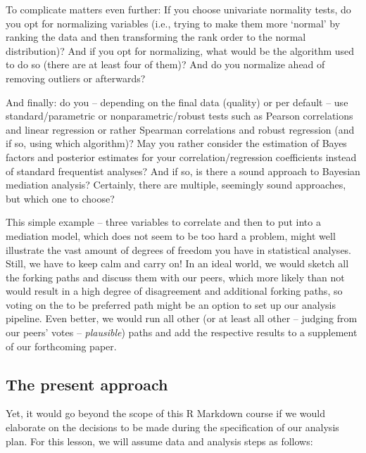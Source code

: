 \documentclass[
]{article}
\begin{document}
To complicate matters even further: If you choose univariate normality
tests, do you opt for normalizing variables (i.e., trying to make them
more `normal' by ranking the data and then transforming the rank order
to the normal distribution)? And if you opt for normalizing, what would
be the algorithm used to do so (there are at least four of them)? And do
you normalize ahead of removing outliers or afterwards?

And finally: do you -- depending on the final data (quality) or per
default -- use standard/parametric or nonparametric/robust tests such as
Pearson correlations and linear regression or rather Spearman
correlations and robust regression (and if so, using which algorithm)?
May you rather consider the estimation of Bayes factors and posterior
estimates for your correlation/regression coefficients instead of
standard frequentist analyses? And if so, is there a sound approach to
Bayesian mediation analysis? Certainly, there are multiple, seemingly
sound approaches, but which one to choose?

This simple example -- three variables to correlate and then to put into
a mediation model, which does not seem to be too hard a problem, might
well illustrate the vast amount of degrees of freedom you have in
statistical analyses. Still, we have to keep calm and carry on! In an
ideal world, we would sketch all the forking paths and discuss them with
our peers, which more likely than not would result in a high degree of
disagreement and additional forking paths, so voting on the to be
preferred path might be an option to set up our analysis pipeline. Even
better, we would run all other (or at least all other -- judging from
our peers' votes -- \emph{plausible}) paths and add the respective
results to a supplement of our forthcoming paper.

\hypertarget{the-present-approach}{%
\subsection{The present approach}\label{the-present-approach}}

Yet, it would go beyond the scope of this R Markdown course if we would
elaborate on the decisions to be made during the specification of our
analysis plan. For this lesson, we will assume data and analysis steps
as follows:
\end{document}
